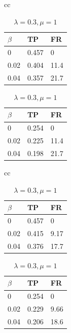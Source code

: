 \documentclass{iseman}
\begin{document}
\setcounter{table}{1}
\begin{table}[htbp]
\begin{center}
\caption{第4工程直後}
\label{tab:result4}
\begin{tabular}{cc}
\begin{minipage}{0.470\hsize}
\captionsetup{labelformat=empty,labelsep=none}
\caption{$\lambda=0.7, \mu=1$}
	\begin{tabular}{| l | l | l |} \hline
		$\beta$ & TP & FR \\ \hline
		0 	 & 0.457 & 0 \\ \hline
		0.02	 & 0.404 & 11.4 \\ \hline
		0.04	 & 0.357 & 21.7 \\ \hline
	\end{tabular}
\end{minipage}
\begin{minipage}{0.470\hsize}
\captionsetup{labelformat=empty,labelsep=none}
\caption{$\lambda=0.3, \mu=1$}
	\begin{tabular}{| l | l | l |} \hline
		$\beta$ & TP & FR \\ \hline
		0 	 & 0.254 & 0 \\ \hline
		0.02	 & 0.225 & 11.4 \\ \hline
		0.04	 & 0.198 & 21.7 \\ \hline
	\end{tabular}
\end{minipage}
\end{tabular}
\end{center}
\end{table}

\setcounter{table}{2}
\begin{table}[htbp]
\begin{center}
\caption{第1工程直後と第4工程直後}
\label{tab:result14}
\begin{tabular}{cc}
\begin{minipage}{0.470\hsize}
\captionsetup{labelformat=empty,labelsep=none}
\caption{$\lambda=0.7, \mu=1$}
	\begin{tabular}{| l | l | l |} \hline
		$\beta$ & TP & FR \\ \hline
		0 	 & 0.457 & 0 \\ \hline
		0.02	 & 0.415 & 9.17 \\ \hline
		0.04	 & 0.376 & 17.7\\ \hline
	\end{tabular}
\end{minipage}
\begin{minipage}{0.470\hsize}
\captionsetup{labelformat=empty,labelsep=none}
\caption{$\lambda=0.3, \mu=1$}
	\begin{tabular}{| l | l | l |} \hline
		$\beta$ & TP & FR \\ \hline
		0 	 & 0.254 & 0 \\ \hline
		0.02	 & 0.229 & 9.66 \\ \hline
		0.04	 & 0.206 & 18.6 \\ \hline
	\end{tabular}
\end{minipage}
\end{tabular}
\end{center}
\end{table}
\end{document}
